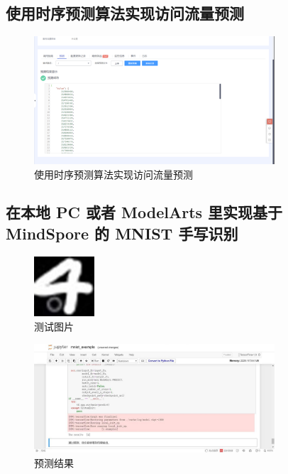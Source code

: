 \documentclass[a4paper,twoside,zihao=5,UTF8]{ctexart}
\begin{document}
\begin{spacing}{1.2}
\subsection{使用时序预测算法实现访问流量预测}

\begin{figure}[H]
	\centering
	\caption{使用时序预测算法实现访问流量预测}
	\label{fig:ai51}
	\includegraphics[width=0.8\textwidth]{task5.png}
\end{figure}

\subsection{在本地 PC 或者 ModelArts 里实现基于 MindSpore 的 MNIST 手写识别}

\begin{figure}[H]
	\centering
	\caption{测试图片}
	\label{fig:ai61}
	\includegraphics[width=0.2\textwidth]{task6_1.jpg}
\end{figure}
\begin{figure}[H]
	\centering
	\caption{预测结果}
	\label{fig:ai62}
	\includegraphics[width=0.8\textwidth]{task6_2.jpg}
\end{figure}


\end{spacing}
\end{document}

